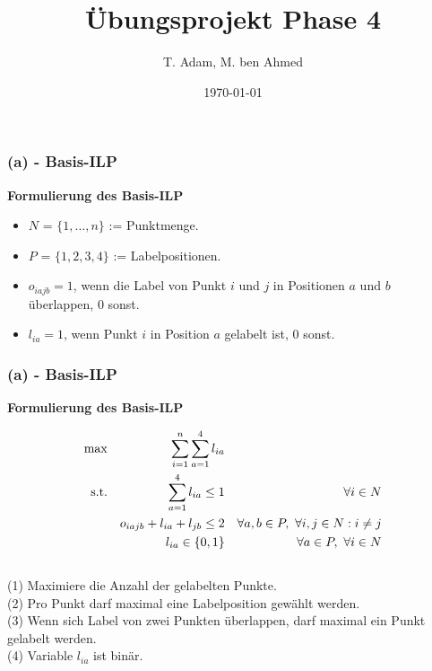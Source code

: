 \documentclass[aspectratio=169]{beamer}
\title[Übungsprojekt Phase 4]{Übungsprojekt Phase 4} %
\author{T. Adam, M. ben Ahmed} %
\institute[UOS] %
{

Universität Osnabrück \\ %

\medskip
\textit{Æ} %


}
\date{\today} %
\begin{document}
\begin{frame}
\titlepage %
\end{frame}





\begin{frame}
	\frametitle{(a) - Basis-ILP}
	\textbf{Formulierung des Basis-ILP}\\
	\begin{itemize}
		\item $N$	= $ \{1,\dotsc,n\}$ := Punktmenge.
		\item $P$ = $ \{1,2,3,4\}$ := Labelpositionen.
		\item $o_{iajb} = 1$, wenn die Label von Punkt $i$ und $j$ in Positionen $a$ und $b$ überlappen, $0$ sonst.
		\item $l_{ia} = 1$, wenn Punkt $i$ in Position $a$ gelabelt ist, 0 sonst.
	\end{itemize}
	\end{frame}


\begin{frame}
	\frametitle{(a) - Basis-ILP}
	\textbf{Formulierung des Basis-ILP}

	\begin{align}
	\max     && \sum_{i = 1}^n \sum_{a = 1}^4 l_{ia} \\
	\text{s.t.}
					&& \sum_{a = 1}^4 l_{ia} \leq 1                    && \forall i \in N\\
					&&   o_{iajb} + l_{ia} + l_{jb} \leq  2        && \forall a,b \in P,\thinspace \thinspace \forall i,j\in N : i \neq j \\
					&&   l_{ia} \in \{0,1\}                            && \forall a \in P,\thinspace \thinspace \forall i\in N                                      
	\end{align}
	\\
	(1) Maximiere die Anzahl der gelabelten Punkte.\\
	(2) Pro Punkt darf maximal eine Labelposition gewählt werden.\\
	(3) Wenn sich Label von zwei Punkten überlappen, darf maximal ein Punkt gelabelt werden.\\
	(4) Variable $l_{ia}$ ist binär.
	\end{frame}
\end{document}
